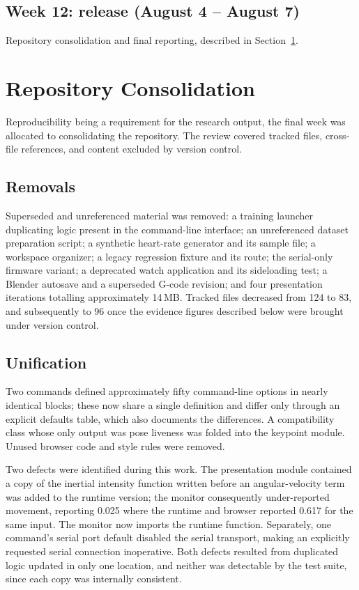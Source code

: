 \documentclass[11pt,a4paper]{article}
\begin{document}
\subsection{Week 12: release (August 4 -- August 7)}

Repository consolidation and final reporting, described in
Section~\ref{sec:consolidation}.

\section{Repository Consolidation}
\label{sec:consolidation}

Reproducibility being a requirement for the research output, the final week was
allocated to consolidating the repository. The review covered tracked files,
cross-file references, and content excluded by version control.

\subsection{Removals}

Superseded and unreferenced material was removed: a training launcher duplicating
logic present in the command-line interface; an unreferenced dataset preparation
script; a synthetic heart-rate generator and its sample file; a workspace
organizer; a legacy regression fixture and its route; the serial-only firmware
variant; a deprecated watch application and its sideloading test; a Blender
autosave and a superseded G-code revision; and four presentation iterations
totalling approximately 14\,MB. Tracked files decreased from 124 to 83, and
subsequently to 96 once the evidence figures described below were brought under
version control.

\subsection{Unification}

Two commands defined approximately fifty command-line options in nearly identical
blocks; these now share a single definition and differ only through an explicit
defaults table, which also documents the differences. A compatibility class whose
only output was pose liveness was folded into the keypoint module. Unused browser
code and style rules were removed.

Two defects were identified during this work. The presentation module contained a
copy of the inertial intensity function written before an angular-velocity term
was added to the runtime version; the monitor consequently under-reported
movement, reporting 0.025 where the runtime and browser reported 0.617 for the
same input. The monitor now imports the runtime function. Separately, one
command's serial port default disabled the serial transport, making an explicitly
requested serial connection inoperative. Both defects resulted from duplicated
logic updated in only one location, and neither was detectable by the test suite,
since each copy was internally consistent.
\end{document}
